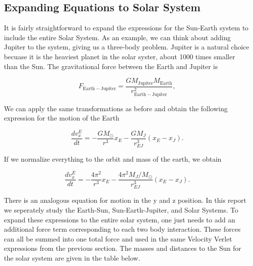\documentclass[%
oneside,                 %
final,                   %
10pt]{article}
\begin{document}
\subsection{Expanding Equations to Solar System}

It is fairly straightforward to expand the expressions for the Sun-Earth system to include the entire Solar System.  As an example, we can think about adding Jupiter to the system, giving us a three-body problem.  Jupiter is a natural choice becuase it is the heaviest planet in the solar syster, about 1000 times smaller than the Sun.  The gravitational force between the Earth and Jupiter is

\[
F_{\mathrm{Earth-Jupiter}}=\frac{GM_{\mathrm{Jupiter}}M_{\mathrm{Earth}}}{r_{\mathrm{Earth-Jupiter}}^2},
\]

We can apply the same transformations as before and obtain the following expression for the motion of the Earth

\[
\frac{dv_x^E}{dt}=-\frac{G M_{\odot}}{r^3}x_E - \frac{G M_{J}}{r^3_{EJ}}(x_E-x_J).
\]

If we normalize everything to the orbit and mass of the earth, we obtain

\[
\frac{dv_x^E}{dt}=-\frac{4 \pi^2}{r^3}x_E - \frac{4 \pi^2 M_J/M_{\odot}}{r^3_{EJ}}(x_E-x_J).
\]

There is an analogous equation for motion in the y and z position.  In this report we seperately study the Earth-Sun, Sun-Earth-Jupiter, and Solar Systems.  To expand these expressions to the entire solar system, one just needs to add an additional force term corresponding to each two body interaction.  These forces can all be summed into one total force and used in the same Velocity Verlet expressions from the previous section.  The masses and distances to the Sun for the solar system are given in the table below.
\end{document}
